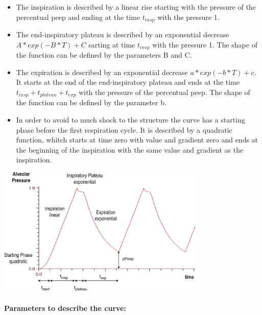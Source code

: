 \begin{itemize}
	\item The inspiration is described by a linear rise starting with the pressure of the percentual peep and ending at the time $t_{insp}$ with the pressure 1.
	\item The end-inspiratory plateau is described by an exponential decrease \linebreak $A*exp(-B*T)+C$ sarting at time $t_{insp}$ with the pressure 1. The shape of the function can be defined by the parameters B and C.
	\item The expiration is described by an exponential decrease $a*exp(-b*T)+c$. It starts at the end of the end-inspiratory plateau and ends at the time $t_{insp}+t_{plateau}+t_{exp}$ with the pressure of the percentual peep. The shape of the function can be defined by the parameter b.
	\item In order to avoid to much shock to the structure the curve has a starting phase before the first respiration cycle. It is described by a quadratic function, whitch starts at time zero with value and gradient zero and ends at the beginning of the inspiration with the same value and gradient as the inspiration.
\end{itemize}
\bigskip \par


\begin{center}
\includegraphics[width=100mm]{PAlveolar}
\end{center}

\paragraph*{Parameters to describe the curve:\\}

